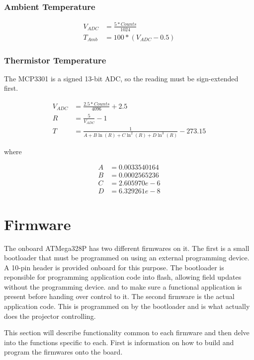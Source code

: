 \documentclass{article}
\begin{document}
\subsubsection{Ambient Temperature}
\begin{align*}
    V_{ADC} &= \frac{5 * Counts}{1024} \\
    T_{Amb} &= 100 * (V_{ADC} - 0.5)
\end{align*}

\subsubsection{Thermistor Temperature}
The MCP3301 is a signed 13-bit ADC, so the reading must be sign-extended first.

\begin{align*}
    V_{ADC} &= \frac{2.5 * Counts}{4096} + 2.5 \\
    R &= \frac{5}{V_{ADC}} - 1 \\
    T &= \frac{1}{A + B\ln(R) + C\ln^2(R) + D\ln^3(R)} - 273.15
\end{align*}

where

\begin{align*}
    A &= 0.0033540164 \\
    B &= 0.0002565236 \\
    C &= 2.605970e-6 \\
    D &= 6.329261e-8
\end{align*}


\section{Firmware} \label{sec:Firmware}
The onboard ATMega328P has two different firmwares on it.  The first is a small bootloader that must
be programmed on using an external programming device.  A 10-pin header is provided onboard for this
purpose.  The bootloader is reponsible for programming application code into flash, allowing field
updates without the programming device. and to make sure a functional application is present before
handing over control to it.  The second firmware is the actual application code.  This is programmed
on by the bootloader and is what actually does the projector controlling.

This section will describe functionality common to each firmware and then delve into the functions
specific to each.  First is information on how to build and program the firmwares onto the board.
\end{document}
